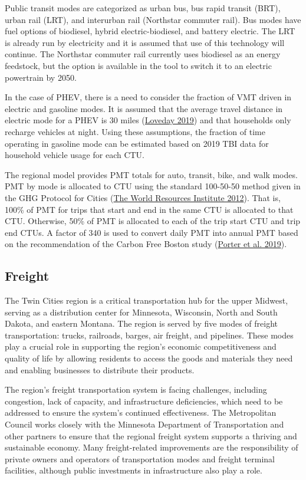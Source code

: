 \documentclass[
]{book}
\begin{document}
Public transit modes are categorized as urban bus, bus rapid transit (BRT), urban rail (LRT), and interurban rail (Northstar commuter rail). Bus modes have fuel options of biodiesel, hybrid electric-biodiesel, and battery electric. The LRT is already run by electricity and it is assumed that use of this technology will continue. The Northstar commuter rail currently uses biodiesel as an energy feedstock, but the option is available in the tool to switch it to an electric powertrain by 2050.

In the case of PHEV, there is a need to consider the fraction of VMT driven in electric and gasoline modes. It is assumed that the average travel distance in electric mode for a PHEV is 30 miles (\protect\hyperlink{ref-lovedayTopPlugInHybrid2019}{Loveday 2019}) and that households only recharge vehicles at night. Using these assumptions, the fraction of time operating in gasoline mode can be estimated based on 2019 TBI data for household vehicle usage for each CTU.

The regional model provides PMT totals for auto, transit, bike, and walk modes. PMT by mode is allocated to CTU using the standard 100-50-50 method given in the GHG Protocol for Cities (\protect\hyperlink{ref-theworldresourcesinstituteWRIAnnualReport2012}{The World Resources Institute 2012}). That is, 100\% of PMT for trips that start and end in the same CTU is allocated to that CTU. Otherwise, 50\% of PMT is allocated to each of the trip start CTU and trip end CTUs. A factor of 340 is used to convert daily PMT into annual PMT based on the recommendation of the Carbon Free Boston study (\protect\hyperlink{ref-porterCarbonFreeBoston2019}{Porter et al. 2019}).

\hypertarget{freight}{%
\subsection{Freight}\label{freight}}

The Twin Cities region is a critical transportation hub for the upper Midwest, serving as a distribution center for Minnesota, Wisconsin, North and South Dakota, and eastern Montana. The region is served by five modes of freight transportation: trucks, railroads, barges, air freight, and pipelines. These modes play a crucial role in supporting the region's economic competitiveness and quality of life by allowing residents to access the goods and materials they need and enabling businesses to distribute their products.

The region's freight transportation system is facing challenges, including congestion, lack of capacity, and infrastructure deficiencies, which need to be addressed to ensure the system's continued effectiveness. The Metropolitan Council works closely with the Minnesota Department of Transportation and other partners to ensure that the regional freight system supports a thriving and sustainable economy. Many freight-related improvements are the responsibility of private owners and operators of transportation modes and freight terminal facilities, although public investments in infrastructure also play a role.
\end{document}
